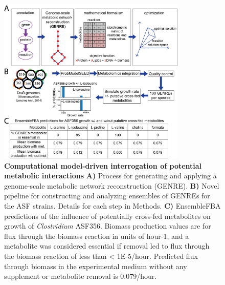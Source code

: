 \documentclass[11pt,twocolumn,notitlepage,openany,twoside]{book}
\begin{document}
\begin{refsection}
\begin{figure}[tb]
\centering
\includegraphics[width=0.8\textwidth]{ch2_figS3}
\caption[Computational model-driven interrogation of potential metabolic interactions and experimental validation of a cross-feeding interaction.]{\textbf{Computational model-driven interrogation of potential metabolic interactions}  \textbf{A)} Process for generating and applying a genome-scale metabolic network reconstruction (GENRE). \textbf{B)} Novel pipeline for constructing and analyzing ensembles of GENREs for the ASF strains. Details for each step in Methods. \textbf{C)} EnsembleFBA predictions of the influence of potentially cross-fed metabolites on growth of \textit{Clostridium} ASF356. Biomass production values are for flux through the biomass reaction in units of hour-1, and a metabolite was considered essential if removal led to flux through the biomass reaction of less than < 1E-5/hour. Predicted flux through biomass in the experimental medium without any supplement or metabolite removal is 0.079/hour.}
\end{figure}


\end{refsection}
\end{document}
